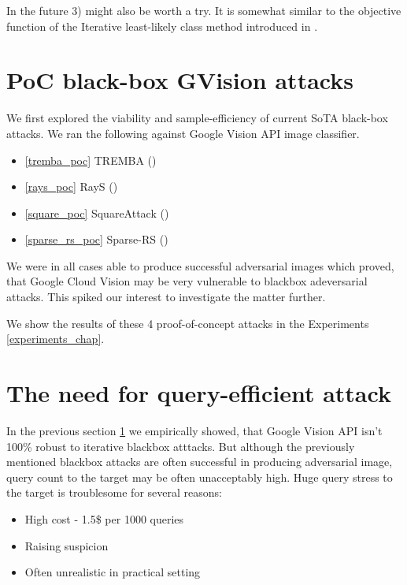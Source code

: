 In the future 3) might also be worth a try. It is somewhat similar to the objective function of the Iterative least-likely class method introduced in \cite{Kurakin2017AdversarialEI}.

\section{PoC black-box GVision attacks}
\label{poc_gvision_attacks}
We first explored the viability and sample-efficiency of current SoTA black-box attacks. We ran the following against Google Vision API image classifier.

\begin{itemize}
    \item \ref{tremba_poc} TREMBA (\cite{Huang2020BlackBoxAA})
    \item \ref{rays_poc} RayS (\cite{Chen2020RaySAR})
    \item \ref{square_poc} SquareAttack (\cite{Andriushchenko2020SquareAA})
    \item \ref{sparse_rs_poc} Sparse-RS (\cite{Croce2020SparseRSAV})
\end{itemize}

We were in all cases able to produce successful adversarial images which proved, that Google Cloud Vision may be very vulnerable to blackbox adeversarial attacks. This spiked our interest to investigate the matter further.

We show the results of these 4 proof-of-concept attacks in the Experiments \ref{experiments_chap}.


\section{The need for query-efficient attack}
\label{need_for_query_efficiency}
In the previous section \ref{poc_gvision_attacks} we empirically showed, that Google Vision API isn't 100\% robust to iterative blackbox atttacks. But although the previously mentioned blackbox attacks are often successful in producing adversarial image, query count to the target may be often unacceptably high. Huge query stress to the target is troublesome for several reasons:

\begin{itemize}
    \item{High cost - 1.5\$ per 1000 queries}
    \item{Raising suspicion}
    \item{Often unrealistic in practical setting}
\end{itemize}


